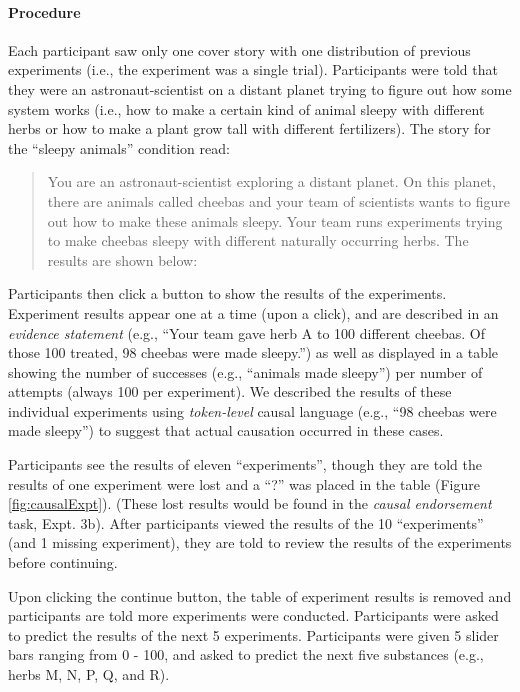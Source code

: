 \documentclass[english,floatsintext,man]{apa6}
\theoremstyle{definition}
\theoremstyle{definition}
\theoremstyle{definition}
\theoremstyle{remark}
\begin{document}
\paragraph{Procedure}\label{procedure-3}

Each participant saw only one cover story with one distribution of
previous experiments (i.e., the experiment was a single trial).
Participants were told that they were an astronaut-scientist on a
distant planet trying to figure out how some system works (i.e., how to
make a certain kind of animal sleepy with different herbs or how to make
a plant grow tall with different fertilizers). The story for the
\enquote{sleepy animals} condition read:

\begin{quotation}
You are an astronaut-scientist exploring a distant planet. 
On this planet, there are animals called cheebas and your team of scientists wants to figure out how to make these animals sleepy.
Your team runs experiments trying to make cheebas sleepy with different naturally occurring herbs.
The results are shown below:
\end{quotation}

Participants then click a button to show the results of the experiments.
Experiment results appear one at a time (upon a click), and are
described in an \emph{evidence statement} (e.g., \enquote{Your team gave
herb A to 100 different cheebas. Of those 100 treated, 98 cheebas were
made sleepy.}) as well as displayed in a table showing the number of
successes (e.g., \enquote{animals made sleepy}) per number of attempts
(always 100 per experiment). We described the results of these
individual experiments using \emph{token-level} causal language (e.g.,
\enquote{98 cheebas were made sleepy}) to suggest that actual causation
occurred in these cases.

Participants see the results of eleven \enquote{experiments}, though
they are told the results of one experiment were lost and a \enquote{?}
was placed in the table (Figure \ref{fig:causalExpt}). (These lost
results would be found in the \emph{causal endorsement} task, Expt. 3b).
After participants viewed the results of the 10 \enquote{experiments}
(and 1 missing experiment), they are told to review the results of the
experiments before continuing.

Upon clicking the continue button, the table of experiment results is
removed and participants are told more experiments were conducted.
Participants were asked to predict the results of the next 5
experiments. Participants were given 5 slider bars ranging from 0 - 100,
and asked to predict the next five substances (e.g., herbs M, N, P, Q,
and R).
\end{document}
